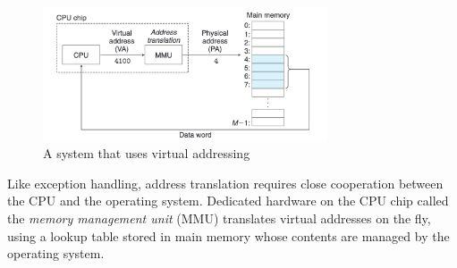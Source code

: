 \documentclass[../ch1.tex, ../../main.tex]{subfiles}
\begin{document}
        \begin{figure}[H]
            \centering
            \includegraphics[width=0.75\textwidth]{graphics/Figure 4.2.png}
            \caption{A system that uses virtual addressing}
            \label{fig:42}
        \end{figure}

        Like exception handling, address translation requires close cooperation between the CPU and the operating system. Dedicated hardware on the CPU chip called the \textit{memory management unit} (MMU) translates virtual addresses on the fly, using a lookup table stored in main memory whose contents are managed by the operating system.
\end{document}
